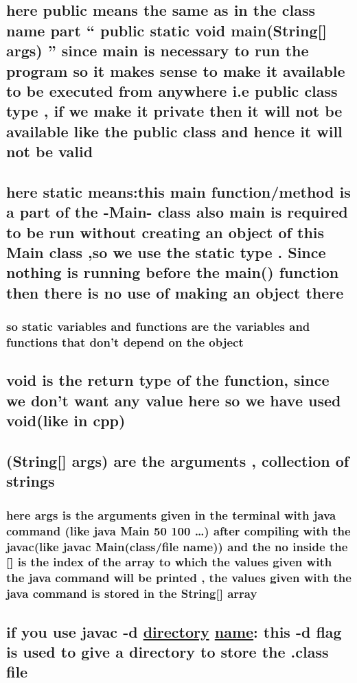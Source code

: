 \documentclass[11pt]{article}
\begin{document}
\subsection{here public means the same as in the class name part `` public static void main(String[] args) '' since main is necessary to run the program so it makes sense to make it available to be executed from anywhere i.e public class type , if we make it private then it will not be available like the public class and hence it will not be valid}
\label{sec:orgfdf5661}
\subsection{here static means:this main function/method is a part of the -Main- class also main is required to be run without creating an object of this Main class ,so we use the static type . Since nothing is running before the main() function then there is no use of making an object there}
\label{sec:org8b42b54}
\subsubsection{so static variables and functions are the variables and functions that don't depend on the object}
\label{sec:org140485f}
\subsection{void is the return type of the function, since we don't want any value here so we have used void(like in cpp)}
\label{sec:orgc52c577}
\subsection{(String[] args) are the arguments , collection of strings}
\label{sec:org3ed5018}
\subsubsection{here args is the arguments given in the terminal with java command (like java Main 50 100 \ldots{}) after compiling with the javac(like javac Main(class/file name)) and the no inside the [] is the index of the array to which the values given with the java command will be printed , the values given with the java command is stored in the String[] array}
\label{sec:orgf1b743e}
\subsection{if you use javac -d \underline{directory} \underline{name}: this -d flag is used to give a directory to store the .class file}
\label{sec:org8b1691e}
\end{document}
